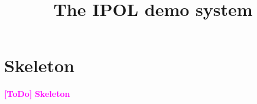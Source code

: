 \documentclass[a4paper,10pt]{article}
\newcommand{\ToDo}[1]{\textcolor{magenta}{\textbf{[ToDo]} \textbf{#1}}}
\begin{document}
\title{The IPOL demo system}

\maketitle

\tableofcontents


\section{Skeleton}
\ToDo{Skeleton}
\end{document}
